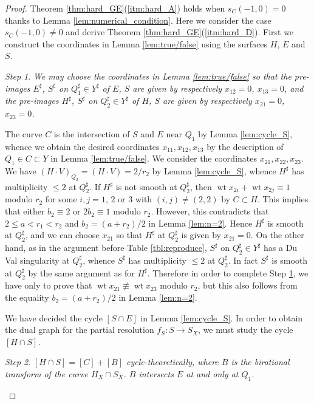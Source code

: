 \documentclass[a4paper,11pt]{amsart}
\theoremstyle{definition}
\theoremstyle{remark}
\newtheorem{step}{Step}
\numberwithin{equation}{section}
\newcommand{\wt}{\operatorname{wt}}
\begin{document}
\begin{proof}
Theorem \ref{thm:hard_GE}(\ref{itm:hard_A}) holds when $s_C(-1,0)=0$
thanks to Lemma \ref{lem:numerical_condition}.
Here we consider the case $s_C(-1,0)\neq0$
and derive Theorem \ref{thm:hard_GE}(\ref{itm:hard_D}).
First we construct the coordinates in Lemma \ref{lem:true/false}
using the surfaces $H$, $E$ and $S$.

\begin{step}\label{stp:hard_GE15-1}
\itshape
We may choose the coordinates in Lemma \textup{\ref{lem:true/false}}
so that the pre-images $E^\sharp$, $S^\sharp$ on $Q_1^\sharp \in Y^\sharp$
of $E$, $S$ are given by respectively $x_{12}=0$, $x_{13}=0$,
and the pre-images $H^\sharp$, $S^\sharp$ on $Q_2^\sharp \in Y^\sharp$
of $H$, $S$ are given by respectively $x_{21}=0$, $x_{23}=0$.
\end{step}

The curve $C$ is the intersection of $S$ and $E$ near $Q_1$
by Lemma \ref{lem:cycle_S},
whence we obtain the desired coordinates $x_{11},x_{12},x_{13}$
by the description of $Q_1\in C \subset Y$ in Lemma \ref{lem:true/false}.
We consider the coordinates $x_{21},x_{22},x_{23}$.
We have $(H \cdot V)_{Q_2}=(H \cdot V)=2/r_2$ by Lemma \ref{lem:cycle_S},
whence $H^\sharp$ has multiplicity $\le 2$ at $Q_2^\sharp$.
If $H^\sharp$ is not smooth at $Q_2^\sharp$,
then $\wt x_{2i} +\wt x_{2j} \equiv 1$ modulo $r_2$
for some $i,j=1$, $2$ or $3$ with $(i,j)\neq(2,2)$ by $C \subset H$.
This implies that either $b_2\equiv2$ or $2b_2\equiv1$ modulo $r_2$.
However,
this contradicts that
$2\le a<r_1<r_2$ and $b_2=(a+r_2)/2$ in Lemma \ref{lem:n=2}.
Hence $H^\sharp$ is smooth at $Q_2^\sharp$,
and we can choose $x_{21}$ so that
$H^\sharp$ at $Q_2^\sharp$ is given by $x_{21}=0$.
On the other hand,
as in the argument before Table \ref{tbl:reproduce},
$S^\sharp$ on $Q_2^\sharp \in Y^\sharp$
has a Du Val singularity at $Q_2^\sharp$,
whence $S^\sharp$ has multiplicity $\le 2$ at $Q_2^\sharp$.
In fact $S^\sharp$ is smooth at $Q_2^\sharp$
by the same argument as for $H^\sharp$.
Therefore in order to complete Step \ref{stp:hard_GE15-1},
we have only to prove that $\wt x_{21}\not\equiv \wt x_{23}$ modulo $r_2$,
but this also follows from the equality $b_2=(a+r_2)/2$ in Lemma \ref{lem:n=2}.

We have decided the cycle $[S \cap E]$ in Lemma \ref{lem:cycle_S}.
In order to obtain the dual graph for
the partial resolution $f_S \colon S \to S_X$,
we must study the cycle $[H \cap S]$.

\begin{step}\label{stp:hard_GE15-2}
\itshape
$[H \cap S]=[C]+[B]$ cycle-theoretically,
where $B$ is the birational transform of the curve $H_X \cap S_X$.
$B$ intersects $E$ at and only at $Q_1$.
\end{step}


\end{proof}
\end{document}
